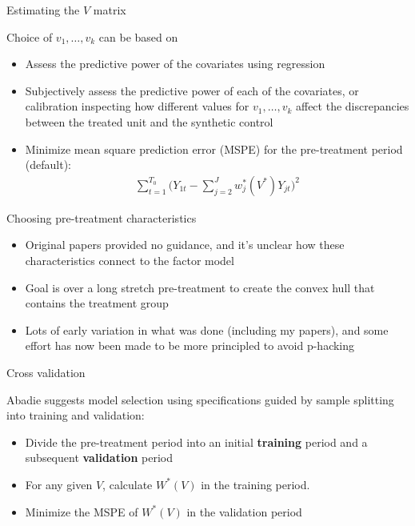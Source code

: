 \documentclass{beamer}
\begin{document}
\begin{frame}{Estimating the $V$ matrix}
	
 Choice of $v_1, \dots, v_k$ can be based on
		\begin{itemize}
		\item Assess the predictive power of the covariates using regression
		\item Subjectively assess the predictive power of each of the covariates, or calibration inspecting how different values for $v_1, \dots, v_k$ affect the discrepancies between the treated unit and the synthetic control
		\item Minimize mean square prediction error (MSPE) for the pre-treatment period (default):
			\begin{eqnarray*}
			\sum_{t=1}^{T_0} \bigg(Y_{1t} - \sum_{j=2}^J w_j^*(V^*)Y_{jt} \bigg)^2
			\end{eqnarray*}
		\end{itemize}
\end{frame}

\begin{frame}{Choosing pre-treatment characteristics}

\begin{itemize}
\item Original papers provided no guidance, and it's unclear how these characteristics connect to the factor model
\item Goal is over a long stretch pre-treatment to create the convex hull that contains the treatment group
\item Lots of early variation in what was done (including my papers), and some effort has now been made to be more principled to avoid p-hacking
\end{itemize}

\end{frame}

\begin{frame}{Cross validation}

Abadie suggests model selection using specifications guided by sample splitting into training and validation:

\begin{itemize}
		\item Divide the pre-treatment period into an initial \textbf{training} period and a subsequent \textbf{validation} period
		\item For any given $V$, calculate $W^*(V)$ in the training period.
		\item Minimize the MSPE of $W^*(V)$ in the validation period
\end{itemize}

\end{frame}
\end{document}
